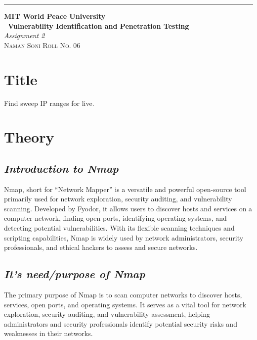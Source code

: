 \documentclass{article}
\begin{document}
\begin{titlepage} %

	\raggedleft\rule{1pt}{\textheight} %
	\hspace{0.05\textwidth} %
	\parbox[b]{0.75\textwidth}
    { %
		
		{\Huge\bfseries MIT World Peace University \\[0.5\baselineskip] \ Vulnerability Identification and Penetration Testing}\\[2\baselineskip] %
		{\large\textit{Assignment 2}}\\[4\baselineskip] %
		{\Large\textsc{Naman Soni Roll No. 06}} %
		
		\vspace{0.5\textheight} %
	}

\end{titlepage}
\tableofcontents
\pagebreak
\section{\textbf{Title}}
Find sweep IP ranges for live.
\section{\textbf{Theory}}
\subsection{\textit{Introduction to Nmap}}
Nmap, short for ``Network Mapper'' is a versatile and powerful open-source tool primarily used for network exploration, security auditing, and vulnerability scanning. Developed by Fyodor, it allows users to discover hosts and services on a computer network, finding open ports, identifying operating systems, and detecting potential vulnerabilities. With its flexible scanning techniques and scripting capabilities, Nmap is widely used by network administrators, security professionals, and ethical hackers to assess and secure networks.
\subsection{\textit{It's need/purpose of Nmap}}
The primary purpose of Nmap is to scan computer networks to discover hosts, services, open ports, and operating systems. It serves as a vital tool for network exploration, security auditing, and vulnerability assessment, helping administrators and security professionals identify potential security risks and weaknesses in their networks.
\end{document}
